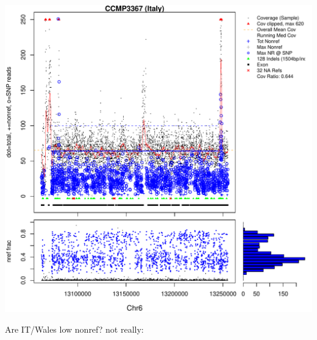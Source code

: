 \documentclass{article}\usepackage[]{graphicx}\usepackage[]{color}
\makeatletter
\def\maxwidth{ %
  \ifdim\Gin@nat@width>\linewidth
    \linewidth
  \else
    \Gin@nat@width
  \fi
}
\newenvironment{knitrout}{}{} %
\makeatother
\begin{document}
\begin{knitrout}
{\includegraphics[width=\maxwidth]{figs-knitr/unnamed-chunk-39-7} 

}



\end{knitrout}

Are IT/Wales low nonref?  not really:
\end{document}
